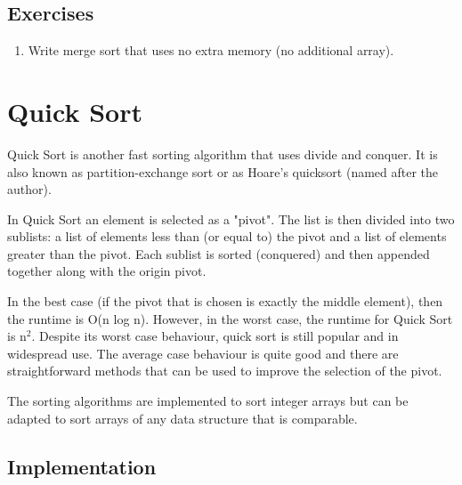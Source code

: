 \documentclass[11pt,oneside]{book}
\begin{document}
\subsection{Exercises}

\begin{enumerate}
\item Write merge sort that uses no extra memory (no additional array).
\end{enumerate}

        \section{ Quick Sort }
        

Quick Sort is another fast sorting algorithm that uses divide and conquer. It is also known as partition-exchange sort or as Hoare's quicksort (named after the author).

In Quick Sort an element is selected as a "pivot". The list is then divided into two sublists: a list of elements less than (or equal to) the pivot and a list of elements greater than the pivot. Each sublist is sorted (conquered) and then appended together along with the origin pivot.

In the best case (if the pivot that is chosen is exactly the middle element), then the runtime is O(n log n). However, in the worst case, the runtime for Quick Sort is n$^{2}$. Despite its worst case behaviour, quick sort is still popular and in widespread use. The average case behaviour is quite good and there are straightforward methods that can be used to improve the selection of the pivot.

The sorting algorithms are implemented to sort integer arrays but can be adapted to sort arrays of any data structure that is comparable.

\subsection{Implementation}
\end{document}
